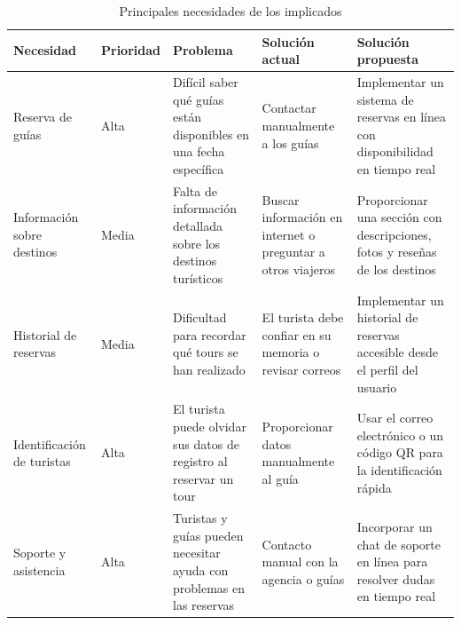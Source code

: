 \begin{table}[H]
\centering
\begin{tabular}{|p{3cm}|p{3cm}|p{3cm}|p{3cm}|p{3cm}|}
\hline
\rowcolor[HTML]{CFE2F3} 
\textbf{Necesidad} & \textbf{Prioridad} & \textbf{Problema} & \textbf{Solución actual} & \textbf{Solución propuesta} \\ \hline
Reserva de guías & Alta & Difícil saber qué guías están disponibles en una fecha específica & Contactar manualmente a los guías & Implementar un sistema de reservas en línea con disponibilidad en tiempo real \\ \hline
Información sobre destinos & Media & Falta de información detallada sobre los destinos turísticos & Buscar información en internet o preguntar a otros viajeros & Proporcionar una sección con descripciones, fotos y reseñas de los destinos \\ \hline
Historial de reservas & Media & Dificultad para recordar qué tours se han realizado & El turista debe confiar en su memoria o revisar correos & Implementar un historial de reservas accesible desde el perfil del usuario \\ \hline
Identificación de turistas & Alta & El turista puede olvidar sus datos de registro al reservar un tour & Proporcionar datos manualmente al guía & Usar el correo electrónico o un código QR para la identificación rápida \\ \hline
Soporte y asistencia & Alta & Turistas y guías pueden necesitar ayuda con problemas en las reservas & Contacto manual con la agencia o guías & Incorporar un chat de soporte en línea para resolver dudas en tiempo real \\ \hline
\end{tabular}
\caption{Principales necesidades de los implicados}
\label{tab:necesidades_implicados}
\end{table}

